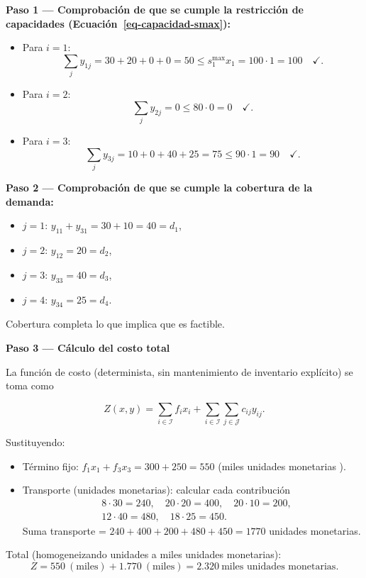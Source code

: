 \documentclass[
  spanish,
  us-letterpaper,
]{scrreprt}
\providecommand{\tightlist}{%
  \setlength{\itemsep}{0pt}\setlength{\parskip}{0pt}}
\numberwithin{equation}{section}
\begin{document}
\textbf{Paso 1 --- Comprobación de que se cumple la restricción de
capacidades (Ecuación~\ref{eq-capacidad-smax}):}

\begin{itemize}
\tightlist
\item
  Para \(i=1\): \[
  \sum_j y_{1j}=30+20+0+0=50 \le s_1^{\max} x_1 = 100\cdot 1 = 100\quad\checkmark.
  \]
\item
  Para \(i=2\): \[
  \sum_j y_{2j}=0 \le 80\cdot 0 = 0\quad\checkmark.
  \]
\item
  Para \(i=3\): \[
  \sum_j y_{3j}=10+0+40+25=75 \le 90\cdot 1 = 90\quad\checkmark.
  \]
\end{itemize}

\textbf{Paso 2 --- Comprobación de que se cumple la cobertura de la
demanda:}

\begin{itemize}
\tightlist
\item
  \(j=1\): \(y_{11}+y_{31}=30+10=40 = d_1\),
\item
  \(j=2\): \(y_{12}=20 = d_2\),
\item
  \(j=3\): \(y_{33}=40 = d_3\),
\item
  \(j=4\): \(y_{34}=25 = d_4\).
\end{itemize}

Cobertura completa lo que implica que es factible.

\textbf{Paso 3 --- Cálculo del costo total}

La función de costo (determinista, sin mantenimiento de inventario
explícito) se toma como

\[
Z(x,y)=\sum_{i\in\mathcal{I}} f_i x_i + \sum_{i\in\mathcal{I}}\sum_{j\in\mathcal{J}} c_{ij} y_{ij}.
\]

Sustituyendo:

\begin{itemize}
\tightlist
\item
  Término fijo: \(f_1 x_1 + f_3 x_3 = 300 + 250 = 550\) (miles unidades
  monetarias ).
\item
  Transporte (unidades monetarias): calcular cada contribución \[
  \begin{aligned}
  &8\cdot 30 = 240,\quad 20\cdot 20 = 400,\quad 20\cdot 10 = 200,\\
  &12\cdot 40 = 480,\quad 18\cdot 25 = 450.
  \end{aligned}
  \] Suma transporte = \(240+400+200+480+450 = 1770\) unidades
  monetarias.
\end{itemize}

Total (homogeneizando unidades a miles unidades monetarias): \[
Z = 550\ (\text{miles}) + 1.770\ (\text{miles}) = 2.320\ \text{miles unidades monetarias}.
\]
\end{document}
